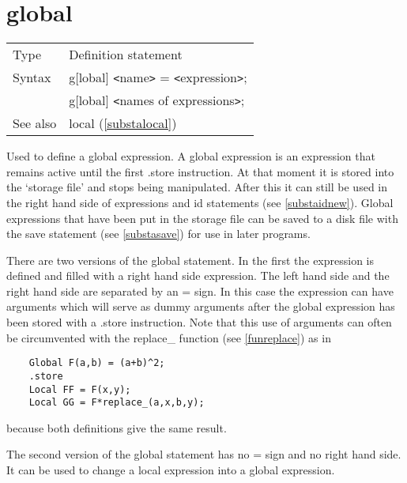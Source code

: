 
\section{global}
\label{substaglobal}

\noindent \begin{tabular}{ll}
Type & Definition statement\\
Syntax & g[lobal] {\tt<}name{\tt>} = {\tt<}expression{\tt>}; \\
       & g[lobal] {\tt<}names of expressions{\tt>};
\\ See also & local (\ref{substalocal})
\end{tabular} \vspace{4mm}

\noindent Used to define a global 
expression. A global expression is an expression that 
remains active until the first .store instruction. At that 
moment it is stored into the `storage file' and stops being manipulated. After this it can 
still be used in the right hand side of expressions and id 
statements (see \ref{substaidnew}). Global expressions that have been put 
in the storage file can be saved to a disk file with the 
save statement (see \ref{substasave}) for use in later programs.

\noindent There are two versions of the global statement. In the first the 
expression is defined and filled with a right hand side expression. The left 
hand side and the right hand side are separated by an = sign. In this case 
the expression can have arguments which will serve as
dummy arguments after the global expression has been 
stored with a .store instruction. Note that this use of arguments can often 
be circumvented with the replace\_ function (see \ref{funreplace}) as in
\begin{verbatim}
    Global F(a,b) = (a+b)^2;
    .store
    Local FF = F(x,y);
    Local GG = F*replace_(a,x,b,y);
\end{verbatim}
because both definitions give the same result.

\noindent The second version of the global statement has no = sign and no 
right hand side. It can be used to change a local expression 
into a global expression. \vspace{10mm}


